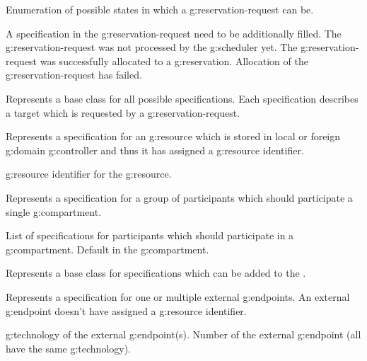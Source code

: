 \begin{Api}
Enumeration of possible states in which a \gls{g:reservation-request} can be.
\begin{ApiEnumValues}
 A specification in the \gls{g:reservation-request} need to be additionally filled.
 The \gls{g:reservation-request} was not processed by the \gls{g:scheduler} yet.
 The \gls{g:reservation-request} was successfully allocated to a \gls{g:reservation}.
 Allocation of the \gls{g:reservation-request} has failed.
\end{ApiEnumValues}

Represents a base class for all possible specifications. Each specification describes a target which is requested by a \gls{g:reservation-request}.

Represents a specification for an \gls{g:resource} which is stored in local or foreign \gls{g:domain} \gls{g:controller} and thus it has assigned a \gls{g:resource} identifier.
\begin{ApiClassAttributes}
 \Gls{g:resource} identifier for the \gls{g:resource}.
\end{ApiClassAttributes}

Represents a specification for a group of participants which should participate a single \gls{g:compartment}.
\begin{ApiClassAttributes}
 List of specifications for participants which should participate in a \gls{g:compartment}.
 Default  in the \gls{g:compartment}.
\end{ApiClassAttributes}

Represents a base class for specifications which can be added to the .

Represents a specification for one or multiple external \glspl{g:endpoint}. An external \gls{g:endpoint} doesn't have assigned a \gls{g:resource} identifier.
\begin{ApiClassAttributes}
 \Gls{g:technology} of the external \gls{g:endpoint}(s).
 Number of the external \gls{g:endpoint} (all have the same \gls{g:technology}).
\end{ApiClassAttributes}


\end{Api}
